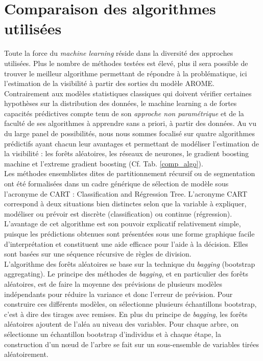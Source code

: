 \section{Comparaison des algorithmes utilisées}

Toute la force du \textit{machine learning} réside dans la diversité des approches utilisées. Plus le  nombre  de  méthodes  testées  est  élevé,  plus  il  sera  possible  de  trouver  le  meilleur algorithme  permettant  de  répondre  à  la  problématique,  ici  l'estimation de la visibilité à partir des sorties du modèle AROME. Contrairement  aux  modèles  statistiques  classiques qui  doivent  vérifier  certaines hypothèses sur  la  distribution  des  données,  le machine  learning a  de  fortes  capacités prédictives  compte  tenu  de  son  \textit{approche  non  paramétrique}  et  de  la  faculté  de  ses algorithmes à apprendre sans a priori, à partir des données. Au vu du large panel de possibilités, nous  nous  sommes focalisé  sur quatre algorithmes prédictifs ayant  chacun  leur avantages  et  permettant  de modéliser  l'estimation de la visibilité :  les forêts aléatoires, les réseaux de neurones, le gradient boosting machine et l’extreme gradient boosting (Cf. Tab. \ref{comp_algo}). \\

Les méthodes ensemblistes dites de partitionnement récursif ou de segmentation ont été formalisées dans un cadre générique de sélection de modèle sous l’acronyme de CART : Classification and  Régression  Tree. L’acronyme CART correspond à deux situations bien distinctes selon  que  la  variable  à  expliquer,  modéliser  ou  prévoir  est discrète (classification) ou continue (régression).  L’avantage  de  cet  algorithme  est  son  pouvoir  explicatif relativement simple, puisque les prédictions obtenues sont présentées sous une forme graphique facile d’interprétation et constituent une aide efficace pour l’aide à la décision. Elles sont basées sur une séquence récursive de règles de division.\\

L’algorithme des forêts aléatoires se base sur la technique du \textit{bagging}  (bootstrap aggregating). Le principe des méthodes de \textit{bagging}, et en particulier des forêts aléatoires, est de faire la moyenne des prévisions de plusieurs modèles indépendants pour réduire la variance et donc l’erreur de prévision. Pour construire ces différents modèles, on sélectionne plusieurs échantillons bootstrap, c’est à dire des tirages avec remises. En plus du principe de \textit{bagging}, les forêts aléatoires ajoutent de l’aléa au niveau des variables. Pour chaque arbre, on  sélectionne  un  échantillon  bootstrap d’individus  et  à  chaque  étape,  la construction d’un nœud de l’arbre se  fait  sur  un  sous-ensemble  de  variables  tirées aléatoirement.\\

